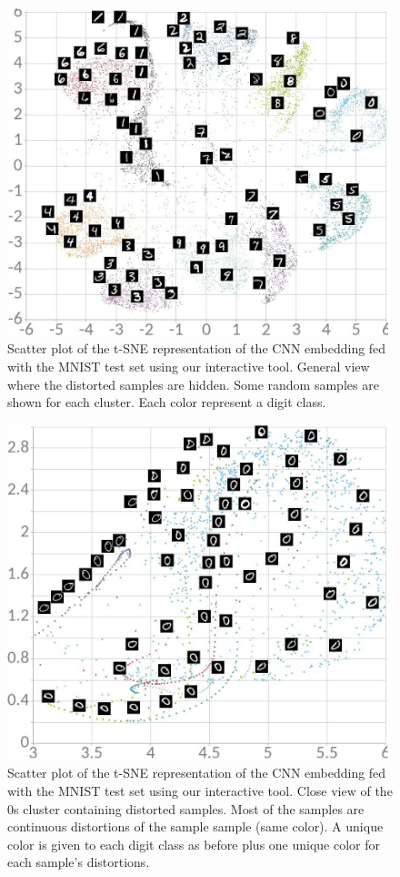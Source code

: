 \documentclass[a4paper,12pt]{report}
\begin{document}
\begin{figure}[t]
    \centering
    \includegraphics[width=\textwidth]{thesis_figures/mnist_nda_tsne.jpg}
    \caption{Scatter plot of the t-SNE representation of the CNN embedding fed with the MNIST test set using our interactive tool. General view where the distorted samples are hidden. Some random samples are shown for each cluster. Each color represent a digit class.}
    \label{fig:mnist_nda_tsne}
\end{figure}

\begin{figure}[t]
    \centering
    \includegraphics[width=\textwidth]{thesis_figures/mnist_nda_tsne2.jpg}
    \caption{Scatter plot of the t-SNE representation of the CNN embedding fed with the MNIST test set using our interactive tool. Close view of the 0s cluster containing distorted samples. Most of the samples are continuous distortions of the sample sample (same color). A unique color is given to each digit class as before plus one unique color for each sample's distortions.}
    \label{fig:mnist_nda_tsne2}
\end{figure}
\end{document}
